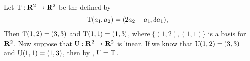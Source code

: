 \begin{example} \label{example 2.1.14}
Let \(\mathrm{T} : \mathbf{R}^2 \to \mathbf{R}^2\) be the \LTRAN{} defined by
\[
    \mathrm{T}(a_1, a_2) = (2 a_2 - a_1, 3 a_1),
\]
Then \(\mathrm{T}(1, 2) = (3, 3)\) and \(\mathrm{T}(1, 1) = (1, 3)\), where \(\{ (1, 2), (1, 1) \}\) is a basis for \(\mathbf{R}^2\).
Now suppose that \(\mathrm{U} : \mathbf{R}^2 \to \mathbf{R}^2\) is linear.
If we know that \(\mathrm{U}(1, 2) = (3, 3)\) and \(\mathrm{U}(1, 1) = (1, 3)\), then by , \(\mathrm{U} = \mathrm{T}\).
\end{example}
